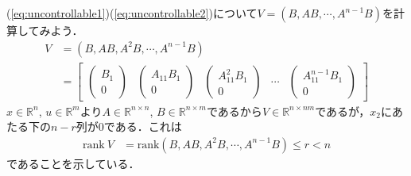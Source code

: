 \documentclass[10pt]{beamer}
\begin{document}
\begin{frame}[t]
(\ref{eq:uncontrollable1})(\ref{eq:uncontrollable2})について$V=(B,AB,\cdots, A^{n-1}B)$を計算してみよう．
\begin{align}
 V & = (B, AB, A^{2}B, \cdots, A^{n-1}B)
\nonumber \\
   & = \left[
          \begin{array}{ccccc}
             \left(
                \begin{array}{c}
                   B_1 \\
                   0
                \end{array}
             \right)
             &
             \left(
                \begin{array}{c}
                   A_{11} B_1 \\
                   0
                \end{array}
             \right)
             &
             \left(
                \begin{array}{c}
                   A_{11}^2 B_1 \\
                   0
                \end{array}
             \right)
             &
             \cdots
             &
             \left(
                \begin{array}{c}
                   A_{11}^{n-1} B_1 \\
                   0
                \end{array}
             \right)
          \end{array}
       \right]
\end{align}
$x \in {\mathbb R}^n$, $ u \in {\mathbb R}^m $より$A\in {\mathbb R}^{n \times n}$, $B \in {\mathbb R}^{n \times m}$であるから$V \in {\mathbb R}^{n \times nm}$であるが，$x_2$にあたる下の$n-r$列が$0$である．これは
\begin{align}
 \mbox{rank}\ V &= \mbox{rank}  (B, AB, A^{2}B, \cdots, A^{n-1}B) \leq r < n
\end{align}
であることを示している．
\end{frame}
\end{document}

